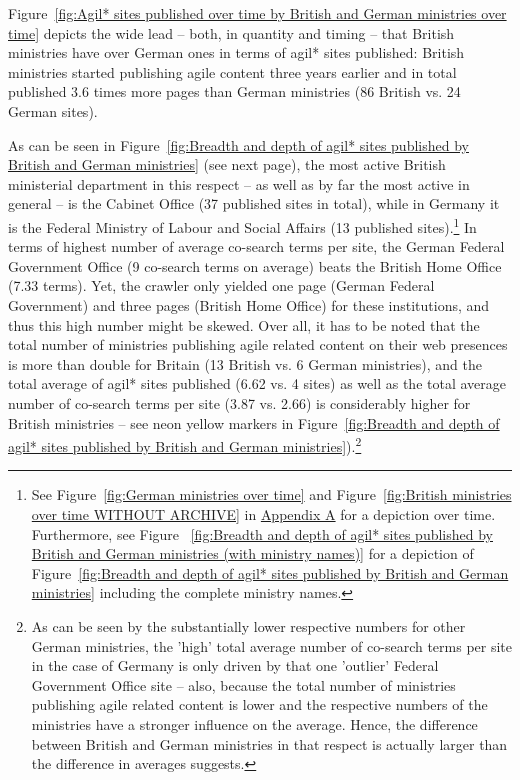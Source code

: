Figure~\ref{fig:Agil* sites published over time by British and German ministries over time} depicts the wide lead – both, in quantity and timing – that British ministries have over German ones in terms of agil* sites published: British ministries started publishing agile content three years earlier and in total published 3.6 times more pages than German ministries (86 British vs. 24 German sites).

As can be seen in Figure~\ref{fig:Breadth and depth of agil* sites published by British and German ministries} (see next page), the most active British ministerial department in this respect – as well as by far the most active in general – is the Cabinet Office (37 published sites in total), while in Germany it is the Federal Ministry of Labour and Social Affairs (13 published sites).\footnote{See Figure~\ref{fig:German ministries over time} and Figure~\ref{fig:British ministries over time WITHOUT ARCHIVE} in \hyperref[Appendix A]{Appendix A} for a depiction over time. Furthermore, see Figure
~\ref{fig:Breadth and depth of agil* sites published by British and German ministries (with ministry names)} for a depiction of Figure~\ref{fig:Breadth and depth of agil* sites published by British and German ministries} including the complete ministry names.} In terms of highest number of average co-search terms per site, the German Federal Government Office (9 co-search terms on average) beats the British Home Office (7.33 terms). Yet, the crawler only yielded one page (German Federal Government) and three pages (British Home Office) for these institutions, and thus this high number might be skewed. Over all, it has to be noted that the total number of ministries publishing agile related content on their web presences is more than double for Britain (13 British vs. 6 German ministries), and the total average of agil* sites published (6.62 vs. 4 sites) as well as the total average number of co-search terms per site (3.87 vs. 2.66) is considerably higher for British ministries – see neon yellow markers in Figure~\ref{fig:Breadth and depth of agil* sites published by British and German ministries}).\footnote{As can be seen by the substantially lower respective numbers for other German ministries, the 'high' total average number of co-search terms per site in the case of Germany is only driven by that one 'outlier' Federal Government Office site – also, because the total number of ministries publishing agile related content is lower and the respective numbers of the ministries have a stronger influence on the average. Hence, the difference between British and German ministries in that respect is actually larger than the difference in averages suggests.}

